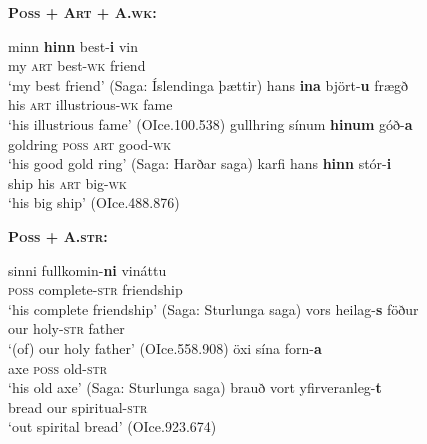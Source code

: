 \documentclass[output=paper,colorlinks,citecolor=brown]{langscibook}
\begin{document}
\begin{exe}
\ex \label{pos}  \textbf{\textsc{Poss + Art + A.wk:}}  
    \begin{xlist}
         \ex\gll  minn \textbf{hinn} best-\textbf{i} vin \\ 
         my \textsc{art} best-\textsc{wk} friend \\ 
         \glt `my best friend' (Saga: Íslendinga þættir)
         \ex\gll    hans \textbf{ina} björt-\textbf{u} frægð \\
         his \textsc{art} illustrious-\textsc{wk} fame \\
         \glt `his illustrious fame'  (OIce.100.538)
         \ex\gll   gullhring sínum \textbf{hinum} góð-\textbf{a} \\ 
         goldring \textsc{poss} \textsc{art} good-\textsc{wk}   \\ 
         \glt `his good gold ring' (Saga: Harðar saga) 
         \ex\gll   karfi hans \textbf{hinn} stór-\textbf{i} \\ 
         ship his \textsc{art} big-\textsc{wk}   \\  
         \glt `his big ship' (OIce.488.876) 
    \end{xlist}
    \ex \label{posB} \textbf{\textsc{Poss +  A.str:}}
    \begin{xlist} 
         \ex\gll    sinni  fullkomin-\textbf{ni} vináttu \\ 
         \textsc{poss} complete-\textsc{str} friendship \\ 
         \glt `his complete friendship' (Saga: Sturlunga saga)
         \ex\gll  vors  heilag-\textbf{s} föður \\ 
         our holy-\textsc{str} father \\ 
          \glt `(of) our holy father' (OIce.558.908)
         \ex \gll öxi sína  forn-\textbf{a}   \\ 
         axe \textsc{poss} old-\textsc{str}  \\ 
         \glt `his old axe' (Saga: Sturlunga saga)
         \ex\gll    brauð vort  yfirveranleg-\textbf{t}  \\ 
          bread our spiritual-\textsc{str}   \\ 
          \glt `out spirital bread' (OIce.923.674)
     \end{xlist} 
\end{exe} 


 
\end{document}
